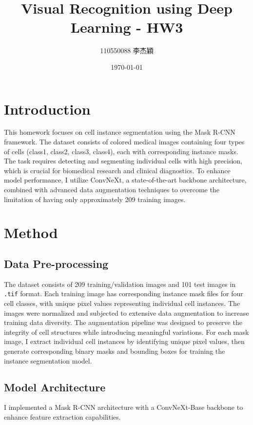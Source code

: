 \documentclass[twocolumn,a4paper]{article}
\title{Visual Recognition using Deep Learning - HW3}
\author{110550088 李杰穎}
\date{\today}
\begin{document}
\maketitle
\section{Introduction}

This homework focuses on cell instance segmentation using the Mask R-CNN\cite{he2017mask} framework. The dataset consists of colored medical images containing four types of cells (class1, class2, class3, class4), each with corresponding instance masks. The task requires detecting and segmenting individual cells with high precision, which is crucial for biomedical research and clinical diagnostics. To enhance model performance, I utilize ConvNeXt\cite{liu2022convnet}, a state-of-the-art backbone architecture, combined with advanced data augmentation techniques to overcome the limitation of having only approximately 209 training images.

\section{Method}

\subsection{Data Pre-processing}
The dataset consists of 209 training/validation images and 101 test images in \texttt{.tif} format. Each training image has corresponding instance mask files for four cell classes, with unique pixel values representing individual cell instances. The images were normalized and subjected to extensive data augmentation to increase training data diversity. The augmentation pipeline was designed to preserve the integrity of cell structures while introducing meaningful variations. For each mask image, I extract individual cell instances by identifying unique pixel values, then generate corresponding binary masks and bounding boxes for training the instance segmentation model.

\subsection{Model Architecture}
I implemented a Mask R-CNN architecture with a ConvNeXt-Base\cite{liu2022convnet} backbone to enhance feature extraction capabilities.
\end{document}
